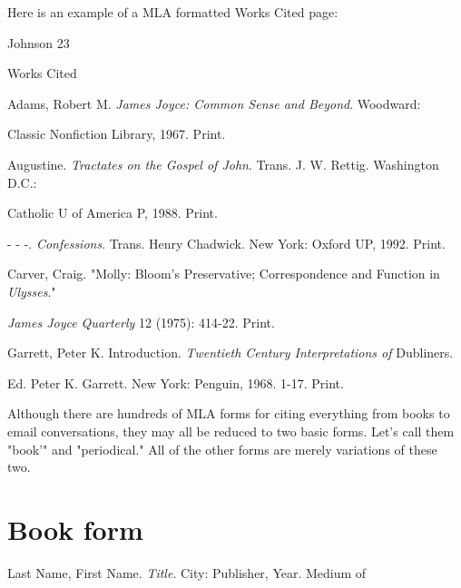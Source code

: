 Here is an example of a MLA formatted Works Cited page:

\newpage
\thispagestyle{empty}
\begin{flushright}Johnson 23\end{flushright}
\begin{center}
Works Cited
\end{center}
\begin{Spacing}{2}

Adams, Robert M. \emph{James Joyce: Common Sense and Beyond}. Woodward: 

\hspace{.4in}Classic Nonfiction Library, 1967. Print.

Augustine. \emph{Tractates on the Gospel of John}. Trans. J. W. Rettig. Washington D.C.:

\hspace{.4in}Catholic U of America P, 1988. Print.

- - -. \emph{Confessions}. Trans. Henry Chadwick. New York: Oxford UP, 1992. Print.

Carver, Craig. "Molly: Bloom's Preservative; Correspondence and Function in \emph{Ulysses}."

\hspace{.4in}\emph{James Joyce Quarterly} 12 (1975): 414-22. Print.

Garrett, Peter K. Introduction. \emph{Twentieth Century Interpretations of} Dubliners.

\hspace{.4in}Ed. Peter K. Garrett. New York: Penguin, 1968. 1-17. Print.

\end{Spacing}

\newpage




										                

Although there are hundreds of MLA forms for citing everything from books to email 
conversations, they may all be reduced to two basic forms. Let's call them "book'" and 
"periodical." All of the other forms are merely variations of these two.

\section{Book form}



Last Name, First Name. \emph{Title}. City: Publisher, Year. Medium of 

